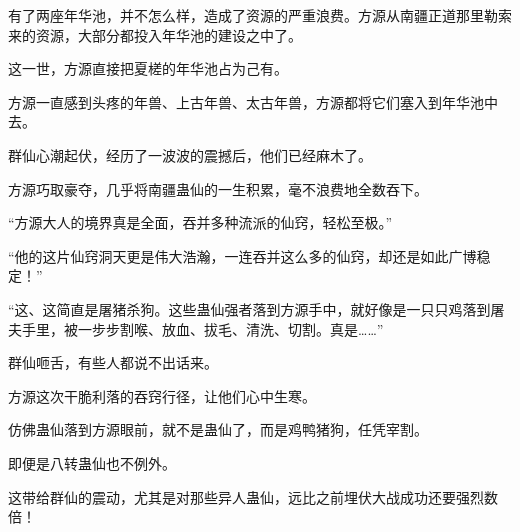 \begin{this_body}
有了两座年华池，并不怎么样，造成了资源的严重浪费。方源从南疆正道那里勒索来的资源，大部分都投入年华池的建设之中了。

这一世，方源直接把夏槎的年华池占为己有。

方源一直感到头疼的年兽、上古年兽、太古年兽，方源都将它们塞入到年华池中去。

群仙心潮起伏，经历了一波波的震撼后，他们已经麻木了。

方源巧取豪夺，几乎将南疆蛊仙的一生积累，毫不浪费地全数吞下。

“方源大人的境界真是全面，吞并多种流派的仙窍，轻松至极。”

“他的这片仙窍洞天更是伟大浩瀚，一连吞并这么多的仙窍，却还是如此广博稳定！”

“这、这简直是屠猪杀狗。这些蛊仙强者落到方源手中，就好像是一只只鸡落到屠夫手里，被一步步割喉、放血、拔毛、清洗、切割。真是……”

群仙咂舌，有些人都说不出话来。

方源这次干脆利落的吞窍行径，让他们心中生寒。

仿佛蛊仙落到方源眼前，就不是蛊仙了，而是鸡鸭猪狗，任凭宰割。

即便是八转蛊仙也不例外。

这带给群仙的震动，尤其是对那些异人蛊仙，远比之前埋伏大战成功还要强烈数倍！

\end{this_body}

